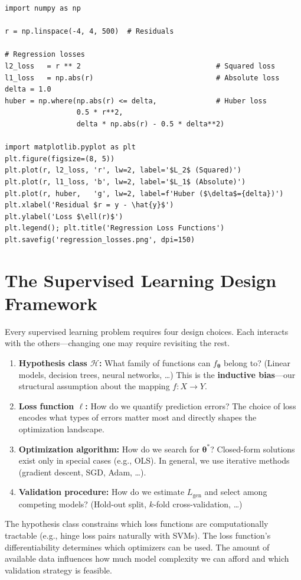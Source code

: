 \begin{lstlisting}[style=pythonstyle]
import numpy as np

r = np.linspace(-4, 4, 500)  # Residuals

# Regression losses
l2_loss   = r ** 2                                # Squared loss
l1_loss   = np.abs(r)                             # Absolute loss
delta = 1.0
huber = np.where(np.abs(r) <= delta,              # Huber loss
                 0.5 * r**2,
                 delta * np.abs(r) - 0.5 * delta**2)

import matplotlib.pyplot as plt
plt.figure(figsize=(8, 5))
plt.plot(r, l2_loss, 'r', lw=2, label='$L_2$ (Squared)')
plt.plot(r, l1_loss, 'b', lw=2, label='$L_1$ (Absolute)')
plt.plot(r, huber,   'g', lw=2, label=f'Huber ($\delta$={delta})')
plt.xlabel('Residual $r = y - \hat{y}$')
plt.ylabel('Loss $\ell(r)$')
plt.legend(); plt.title('Regression Loss Functions')
plt.savefig('regression_losses.png', dpi=150)
\end{lstlisting}

\section*{The Supervised Learning Design Framework}

Every supervised learning problem requires four design choices. Each interacts with the others---changing one may require revisiting the rest.

\begin{enumerate}
    \item \textbf{Hypothesis class $\mathcal{H}$:} What family of functions can $f_{\boldsymbol{\theta}}$ belong to? (Linear models, decision trees, neural networks, \ldots) This is the \textbf{inductive bias}---our structural assumption about the mapping $f: X \to Y$.

    \item \textbf{Loss function $\ell$:} How do we quantify prediction errors? The choice of loss encodes what types of errors matter most and directly shapes the optimization landscape.

    \item \textbf{Optimization algorithm:} How do we search for $\boldsymbol{\theta}^*$? Closed-form solutions exist only in special cases (e.g., OLS). In general, we use iterative methods (gradient descent, SGD, Adam, \ldots).

    \item \textbf{Validation procedure:} How do we estimate $L_{\text{gen}}$ and select among competing models? (Hold-out split, $k$-fold cross-validation, \ldots)
\end{enumerate}

\begin{remark}
The hypothesis class constrains which loss functions are computationally tractable (e.g., hinge loss pairs naturally with SVMs). The loss function's differentiability determines which optimizers can be used. The amount of available data influences how much model complexity we can afford and which validation strategy is feasible.
\end{remark}
